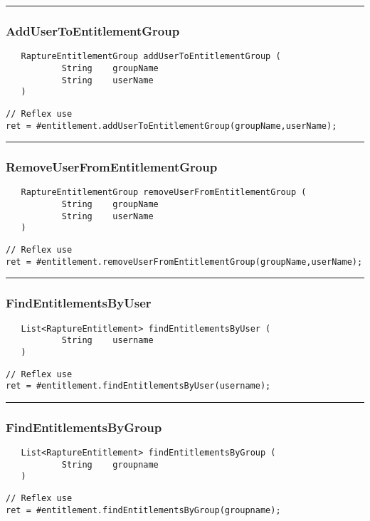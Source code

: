 \rule{15cm}{2pt}
\subsubsection{AddUserToEntitlementGroup}
\label{Api:AddUserToEntitlementGroup}
\begin{verbatim}
   RaptureEntitlementGroup addUserToEntitlementGroup (
           String    groupName
           String    userName
   )
\end{verbatim}
\begin{lstlisting}[language=reflex]
// Reflex use
ret = #entitlement.addUserToEntitlementGroup(groupName,userName);
\end{lstlisting}



\rule{15cm}{2pt}
\subsubsection{RemoveUserFromEntitlementGroup}
\label{Api:RemoveUserFromEntitlementGroup}
\begin{verbatim}
   RaptureEntitlementGroup removeUserFromEntitlementGroup (
           String    groupName
           String    userName
   )
\end{verbatim}
\begin{lstlisting}[language=reflex]
// Reflex use
ret = #entitlement.removeUserFromEntitlementGroup(groupName,userName);
\end{lstlisting}



\rule{15cm}{2pt}
\subsubsection{FindEntitlementsByUser}
\label{Api:FindEntitlementsByUser}
\begin{verbatim}
   List<RaptureEntitlement> findEntitlementsByUser (
           String    username
   )
\end{verbatim}
\begin{lstlisting}[language=reflex]
// Reflex use
ret = #entitlement.findEntitlementsByUser(username);
\end{lstlisting}



\rule{15cm}{2pt}
\subsubsection{FindEntitlementsByGroup}
\label{Api:FindEntitlementsByGroup}
\begin{verbatim}
   List<RaptureEntitlement> findEntitlementsByGroup (
           String    groupname
   )
\end{verbatim}
\begin{lstlisting}[language=reflex]
// Reflex use
ret = #entitlement.findEntitlementsByGroup(groupname);
\end{lstlisting}




